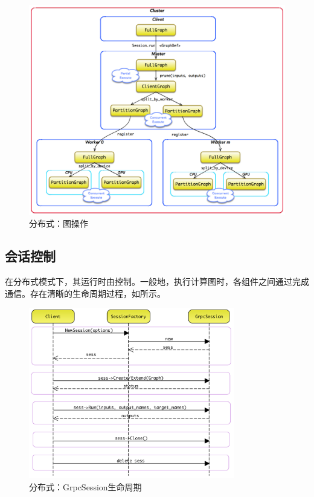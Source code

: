 \begin{content}
\begin{figure}[H]
\centering
\includegraphics[width=1.0\textwidth]{figures/dist-runtime.png}
\caption{分布式：图操作}
 \label{fig:dist-runtime}
\end{figure}

\subsection{会话控制}

在分布式模式下，其运行时由控制。一般地，执行计算图时，各组件之间通过完成通信。存在清晰的生命周期过程，如所示。

\begin{figure}[H]
\centering
\includegraphics[width=0.8\textwidth]{figures/dist-grpc-session-lifecycle.png}
\caption{分布式：GrpcSession生命周期}
 \label{fig:dist-grpc-session-lifecycle}
\end{figure}


\end{content}

